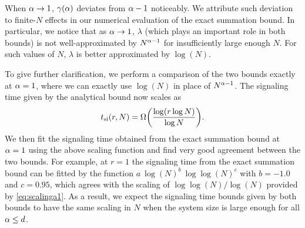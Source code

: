 When $\alpha\rightarrow 1$, $\gamma(\alpha)$ deviates from $\alpha-1$ noticeably. We attribute such deviation to finite-$N$ effects in our numerical evaluation of the exact summation bound. In particular, we notice that as $\alpha\rightarrow 1$, $\lambda$ (which plays an important role in both bounds) is not well-approximated by $N^{\alpha-1}$ for insufficiently large enough $N$. For such values of $N$, $\lambda$ is better approximated by $\log(N)$.

To give further clarification, we perform a comparison of the two bounds exactly at $\alpha=1$, where we can exactly use $\log(N)$ in place of $N^{\alpha-1}$. The signaling time given by the analytical bound now scales as
\begin{equation}
	t_\text{si}(r,N) = \W{\frac{\log(r\log N)}{\log N}}.\label{eq:scalinga1}
\end{equation}
We then fit the signaling time obtained from the exact summation bound at $\alpha=1$ using the above scaling function and find very good agreement between the two bounds. For example, at $r=1$ the signaling time from the exact summation bound can be fitted by the function $ a\:\log(N)^b\:\log\log(N)^c$ with $b=-1.0$ and $c=0.95$, which agrees with the scaling of $\log\log(N)/\log(N)$ provided by \cref{eq:scalinga1}. As a result, we expect the signaling time bounds given by both bounds to have the same scaling in $N$ when the system size is large enough for all $\alpha\le d$.
